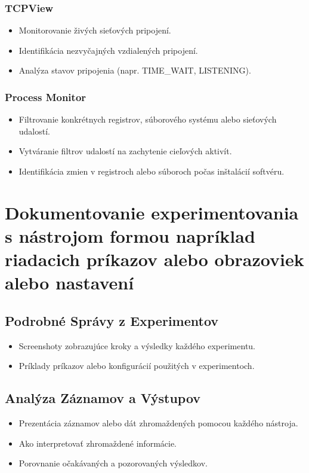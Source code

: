\documentclass[conference]{IEEEtran}
\begin{document}
\subsubsection{TCPView}
\begin{itemize}
    \item Monitorovanie živých sieťových pripojení.
    \item Identifikácia nezvyčajných vzdialených pripojení.
    \item Analýza stavov pripojenia (napr. TIME\_WAIT, LISTENING).
\end{itemize}

\subsubsection{Process Monitor}
\begin{itemize}
    \item Filtrovanie konkrétnych registrov, súborového systému alebo sieťových udalostí.
    \item Vytváranie filtrov udalostí na zachytenie cieľových aktivít.
    \item Identifikácia zmien v registroch alebo súboroch počas inštalácií softvéru.
\end{itemize}

\section{Dokumentovanie experimentovania s nástrojom formou napríklad riadacich príkazov alebo obrazoviek alebo nastavení}
\subsection{Podrobné Správy z Experimentov}
\begin{itemize}
    \item Screenshoty zobrazujúce kroky a výsledky každého experimentu.
    \item Príklady príkazov alebo konfigurácií použitých v experimentoch.
\end{itemize}

\subsection{Analýza Záznamov a Výstupov}
\begin{itemize}
    \item Prezentácia záznamov alebo dát zhromaždených pomocou každého nástroja.
    \item Ako interpretovať zhromaždené informácie.
    \item Porovnanie očakávaných a pozorovaných výsledkov.
\end{itemize}
\end{document}
